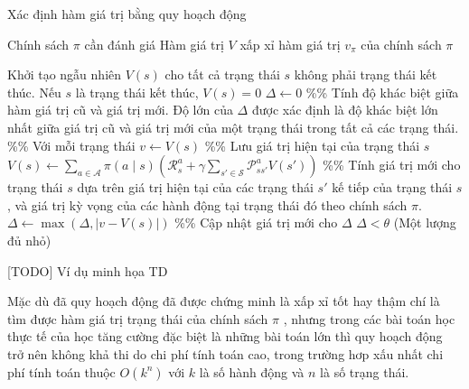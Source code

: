 \begin{algorithm}
	\caption{Xác định hàm giá trị bằng quy hoạch động}
	\label{alg_DP}
	\begin{algorithmic}[1]
		\renewcommand{\algorithmicrequire}{\textbf{Đầu vào:}}
		\renewcommand{\algorithmicensure}{\textbf{Đầu ra:}}
		\algnewcommand{}
		\algnewcommand\Operation{\item[\algorithmicoperation]}
		
		\Require Chính sách $\pi$ cần đánh giá
		\Ensure Hàm giá trị $V$ xấp xỉ hàm giá trị $v_{\pi}$ của chính sách $\pi$
		
		\Operation
		\State Khởi tạo ngẫu nhiên $V(s)$ cho tất cả trạng thái $s$ không phải trạng thái kết thúc. Nếu $s$ là trạng thái kết thúc, $V(s) = 0$
		\Repeat
		\State $\Delta \leftarrow 0$ \%\% Tính độ khác biệt giữa hàm giá trị cũ và giá trị mới. Độ lớn của $\Delta$ được xác định là độ khác biệt lớn nhất giữa giá trị cũ và giá trị mới của một trạng thái trong tất cả các trạng thái.
		 \%\% Với mỗi trạng thái
		\State $v \leftarrow  V(s)$ \%\% Lưu giá trị hiện tại của trạng thái $s$
		\State $V(s) \leftarrow \sum_{a \in \mathcal{A}}^{}\pi(a \mid s)(\mathcal{R}_{s}^{a} + \gamma \sum_{s' \in \mathcal{S}}^{}\mathcal{P}_{ss'}^{a}V(s'))$ \%\% Tính giá trị mới cho trạng thái $s$ dựa trên giá trị hiện tại của các trạng thái $s'$ kế tiếp của trạng thái $s$, và giá trị kỳ vọng của các hành động tại trạng thái đó theo chính sách $\pi$.
		\State $\Delta \leftarrow \max(\Delta, \left |v - V(s) \right |)$ \%\% Cập nhật giá trị mới cho $\Delta$
		\EndFor
		\Until $\Delta < \theta$ (Một lượng đủ nhỏ) 
	\end{algorithmic}
\end{algorithm}

[TODO] Ví dụ minh họa TD

Mặc dù đã quy hoạch động đã được chứng minh là xấp xỉ tốt hay thậm chí là tìm được hàm giá trị trạng thái của chính sách $\pi$ \cite{gordon1995stable}, nhưng trong các bài toán học thực tế của học tăng cường đặc biệt là những bài toán lớn thì quy hoạch động trở nên không khả thi do chi phí tính toán cao, trong trường hơp xấu nhất chi phí tính toán thuộc $O(k^{n})$ với $k$ là số hành động và $n$ là số trạng thái.

